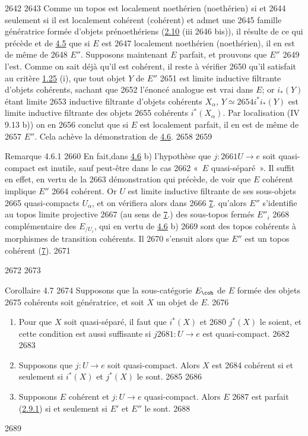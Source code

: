   2642	
  2643	Comme un topos est localement noethérien (\resp noethérien) si et
  2644	seulement si il est localement cohérent (\resp cohérent) et admet une
  2645	famille génératrice formée d'objets prénoethériens (\hyperref[VI.prop2.10]{2.10} (iii
  2646	bis)), il résulte de ce qui précède et de \hyperref[VI.cor4.5]{4.5} que si $E$ est
  2647	localement noethérien (\resp noethérien), il en est de même de
  2648	$E''$. Supposons maintenant $E$ parfait, et prouvons que $E''$
  2649	l'est. Comme on sait déjà qu'il est cohérent, il reste à vérifier
  2650	qu'il satisfait au critère \hyperref[VI.cor1.25]{1.25} (i), \ie que tout objet $Y$ de $E''$
  2651	est limite inductive filtrante d'objets  cohérents, sachant que
  2652	l'énoncé analogue est vrai dans $E$; or $i_{\ast}(Y)$ étant limite
  2653	inductive filtrante d'objets cohérents $X_{\alpha}$, $Y \simeq
  2654	i^{\ast}i_{\ast}(Y)$ est limite inductive filtrante des objets
  2655	cohérents $i^{\ast}(X_{\alpha})$. Par localisation (IV 9.13 b)) on en
  2656	conclut que si $E$ est localement parfait, il en est de même de
  2657	$E''$. Cela achève la démonstration de \hyperref[VI.prop4.6]{4.6}.
  2658	
  2659	\begin{enonce*}[remark]{Remarque 4.6.1}
  2660	En fait,\pageoriginale dans \hyperref[VI.prop4.6]{4.6} b) l'hypothèse que $j :
  2661	U \to e$ soit quasi-compact est inutile, sauf peut-être dans le cas
  2662	« $E$ quasi-séparé ». Il suffit en effet, en vertu de la
  2663	démonstration qui précède, de voir que $E$ cohérent implique $E''$
  2664	cohérent. Or $U$ est limite inductive filtrante de ses sous-objets
  2665	quasi-compacts $U_{\alpha}$, et on vérifiera alors dans
  2666	\hyperref[VI.sec7]{7}. qu'alors $E''$ s'identifie au topos limite projective
  2667	(au sens de \hyperref[VI.sec7]{7}.) des sous-topos fermés $E''_i$
  2668	complémentaire des $E_{/U_i}$, qui en vertu de \hyperref[VI.prop4.6]{4.6} b)
  2669	sont des topos cohérents à morphismes de transition cohérents. Il
  2670	s'ensuit alors que $E''$ est un topos cohérent (\hyperref[VI.sec7]{7}).
  2671	\end{enonce*}
  2672	
  2673	\begin{enonce*}{Corollaire 4.7}
  2674	Supposons que la sous-catégorie $E_{\coh}$ de $E$ formée des objets
  2675	cohérents soit génératrice, et soit $X$ un objet de $E$.
  2676	\begin{enumerate}
  2677	\renewcommand{\theenumi}{\alph{enumi}}
  2678	\renewcommand{\labelenumi}{\theenumi)}
  2679	\item Pour que $X$ soit quasi-séparé, il faut que $i^{\ast}(X)$ et
  2680	  $j^{\ast}(X)$ le soient, et cette condition est aussi suffisante si $j
  2681	  :U \to e$ est quasi-compact.
  2682	
  2683	\item Supposons que $j : U \to e$ soit quasi-compact. Alors $X$ est
  2684	  cohérent si et seulement si $i^{\ast}(X)$ et $j^{\ast}(X)$ le sont.
  2685	
  2686	\item Supposons $E$ cohérent et $j : U \to e$ quasi-compact. Alors $E$
  2687	  est parfait (\hyperref[VI.def2.9.1]{2.9.1}) si et seulement si $E'$ et $E''$ le sont.
  2688	\end{enumerate}
  2689	\end{enonce*}
